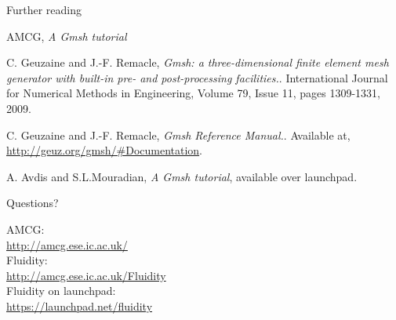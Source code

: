 \documentclass[t]{beamer}
\begin{document}
\begin{frame}{Further reading}
\begin{thebibliography}{9}

  AMCG, 
  \emph{A Gmsh tutorial}

  C. Geuzaine and J.-F. Remacle,
  \emph{Gmsh: a three-dimensional finite element mesh generator with built-in pre- and post-processing facilities.}.
  International Journal for Numerical Methods in Engineering,
  Volume 79, Issue 11,
  pages 1309-1331, 2009.

  C. Geuzaine and J.-F. Remacle,
  \emph{Gmsh Reference Manual.}.
  Available at,
  \url{http://geuz.org/gmsh/\#Documentation}.

  A. Avdis and S.L.Mouradian,
  \emph{A Gmsh tutorial},
  available over launchpad.

  \end{thebibliography}

\end{frame}

\begin{frame}{Questions?}
\begin{center}
\vfill
AMCG:\\
\url{http://amcg.ese.ic.ac.uk/}\\[20pt]
Fluidity:\\
\url{http://amcg.ese.ic.ac.uk/Fluidity}\\[20pt]
Fluidity on launchpad:\\
\url{https://launchpad.net/fluidity}
\end{center}
\end{frame}
\end{document}
